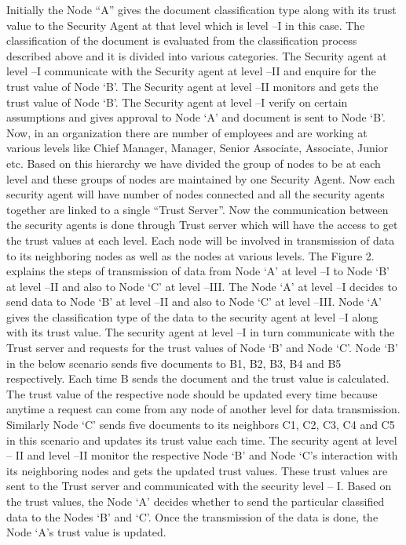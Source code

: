 Initially the Node “A” gives the document classification type along with its trust value to the Security Agent at that level which is level –I in this case. The classification of the document is evaluated from the classification process described above and it is divided into various categories. The Security agent at level –I communicate with the Security agent at level –II and enquire for the trust value of Node ‘B’. The Security agent at level –II monitors and gets the trust value of Node ‘B’. The Security agent at level –I verify on certain assumptions and gives approval to Node ‘A’ and document is sent to Node ‘B’.
Now, in an organization there are number of employees and are working at various levels like Chief Manager, Manager, Senior Associate, Associate, Junior etc. Based on this hierarchy we have divided the group of nodes to be at each level and these groups of nodes are maintained by one Security Agent. Now each security agent will have number of nodes connected and all the security agents together are linked to a single “Trust Server”. Now the communication between the security agents is done through Trust server which will have the access to get the trust values at each level. Each node will be involved in transmission of data to its neighboring nodes as well as the nodes at various levels. The Figure 2. explains the steps of transmission of data from Node ‘A’ at level –I  to Node ‘B’ at level –II and also to Node ‘C’ at level –III. The Node ‘A’ at level –I decides to send data to Node ‘B’ at level –II and also to Node ‘C’ at level –III. Node ‘A’ gives the classification type of the data to the security agent at level –I along with its trust value. The security agent at level –I in turn communicate with the Trust server and requests for the trust values of Node ‘B’ and Node ‘C’. Node ‘B’ in the below scenario sends five documents to B1, B2, B3, B4 and B5 respectively. Each time B sends the document and the trust value is calculated. The trust value of the respective node should be updated every time because anytime a request can come from any node of another level for data transmission. Similarly Node ‘C’ sends five documents to its neighbors C1, C2, C3, C4 and C5 in this scenario and updates its trust value each time. The security agent at level – II and level –II monitor the respective Node ‘B’ and Node ‘C’s interaction with its neighboring nodes and gets the updated trust values. These trust values are sent to the Trust server and communicated with the security level – I. Based on the trust values, the Node ‘A’ decides whether to send the particular classified data to the Nodes ‘B’ and ‘C’. Once the transmission of the data is done, the Node ‘A’s trust value is updated.


